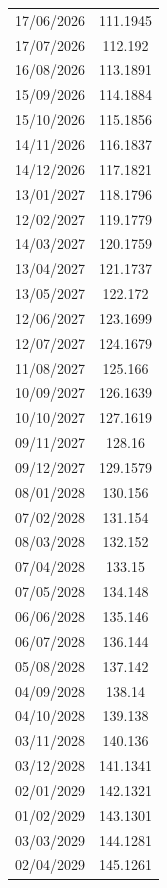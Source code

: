\documentclass{apmcmthesis}
\begin{document}
\begin{longtable}{c c}
        17/06/2026 & 111.1945   \\
        17/07/2026 & 112.192    \\
        16/08/2026 & 113.1891   \\
        15/09/2026 & 114.1884   \\
        15/10/2026 & 115.1856   \\
        14/11/2026 & 116.1837   \\
        14/12/2026 & 117.1821   \\
        13/01/2027 & 118.1796   \\
        12/02/2027 & 119.1779   \\
        14/03/2027 & 120.1759   \\
        13/04/2027 & 121.1737   \\
        13/05/2027 & 122.172    \\
        12/06/2027 & 123.1699   \\
        12/07/2027 & 124.1679   \\
        11/08/2027 & 125.166    \\
        10/09/2027 & 126.1639   \\
        10/10/2027 & 127.1619   \\
        09/11/2027 & 128.16     \\
        09/12/2027 & 129.1579   \\
        08/01/2028 & 130.156    \\
        07/02/2028 & 131.154    \\
        08/03/2028 & 132.152    \\
        07/04/2028 & 133.15     \\
        07/05/2028 & 134.148    \\
        06/06/2028 & 135.146    \\
        06/07/2028 & 136.144    \\
        05/08/2028 & 137.142    \\
        04/09/2028 & 138.14     \\
        04/10/2028 & 139.138    \\
        03/11/2028 & 140.136    \\
        03/12/2028 & 141.1341   \\
        02/01/2029 & 142.1321   \\
        01/02/2029 & 143.1301   \\
        03/03/2029 & 144.1281   \\
        02/04/2029 & 145.1261   \\

\end{longtable}
\end{document}
